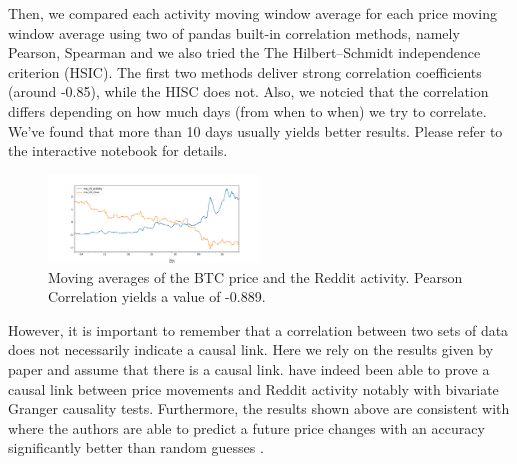 Then, we compared each activity moving window average for each price moving window average using two of pandas built-in correlation methods, namely Pearson, Spearman and we also tried the The Hilbert–Schmidt independence criterion (HSIC). The first two methods deliver strong correlation coefficients (around -0.85), while the HISC does not. Also, we notcied that the correlation differs depending on how much days (from when to when) we try to correlate. We've found that more than 10 days usually yields better results. Please refer to the interactive notebook for details.

\begin{figure}[H]
    \centering
    \includegraphics[width=0.5\textwidth]{figures/corr_pearson_0}
    \caption{Moving averages of the BTC price and the Reddit activity. Pearson Correlation yields a value of -0.889.}
\end{figure}


However, it is important to remember that a correlation between two sets of data does not necessarily indicate a causal link. Here we rely on the results given by paper  and assume that there is a causal link. \citeauthor{wooleyExtractingCryptocurrencyPrice2019} have indeed been able to prove a causal link between price movements and Reddit activity notably with bivariate Granger causality tests. Furthermore, the results shown above are consistent with  where the authors are able to predict a future price changes with an accuracy significantly better than random guesses \cite{iderCryptocurrencyReturnPrediction2022}.



